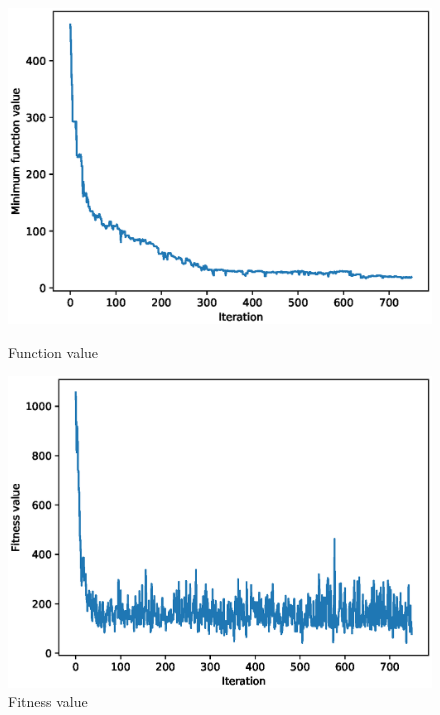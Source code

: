 \documentclass{article}
\begin{document}
\begin{figure}[!htbp]
	\centering
	\begin{minipage}{.48\textwidth}
		\centering
		\includegraphics[scale=.4]{experiment_1b_griewangk/min_eval_0.eps}
		\caption{Function value}
	\end{minipage}\hfill
	\begin{minipage}{.48\textwidth}
		\centering
		\includegraphics[scale=.4]{experiment_1b_griewangk/max_fitness_0.eps}
		\caption{Fitness value}
	\end{minipage}
\end{figure}
\FloatBarrier
\end{document}

